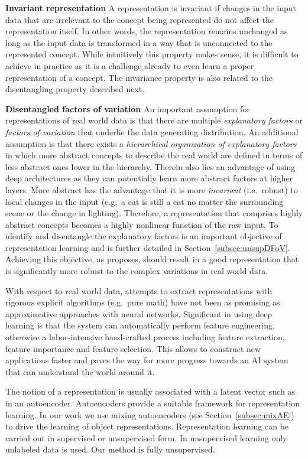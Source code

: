 \documentclass[a4paper,12pt]{report}
\begin{document}
\textbf{Invariant representation}
A representation is invariant if changes in the input data that are irrelevant to the concept being represented do not affect the representation itself. In other words, the representation remains unchanged as long as the input data is transformed in a way that is unconnected to the represented concept. While intuitively this property makes sense, it is difficult to achieve in practice as it is a challenge already to even learn a proper representation of a concept. The invariance property is also related to the disentangling property described next.

\textbf{Disentangled factors of variation} An important assumption for representations of real world data is that there are multiple \textit{explanatory factors} or \textit{factors of variation} that underlie the data generating distribution. An additional assumption is that there exists a \textit{hierarchical organization of explanatory factors} in which more abstract concepts to describe the real world are defined in terms of less abstract ones lower in the hierarchy. Therein also lies an advantage of using deep architectures as they can potentially learn more abstract factors at higher layers. More abstract has the advantage that it is more \textit{invariant} (i.e.\ robust) to local changes in the input (e.g.\ a cat is still a cat no matter the surrounding scene or the change in lighting). Therefore, a representation that comprises highly abstract concepts becomes a highly nonlinear function of the raw input. To identify and disentangle the explanatory factors is an important objective of representation learning and is further detailed in Section~\ref{subsec:unsupDFoV}. Achieving this objective, as \cite{ReprLearning} proposes, should result in a good representation that is significantly more robust to the complex variations in real world data. 

With respect to real world data, attempts to extract representations with rigorous explicit algorithms (e.g.\ pure math) have not been as promising as approximative approaches with neural networks. Significant in using deep learning is that the system can automatically perform feature engineering, otherwise a labor-intensive hand-crafted process including feature extraction, feature importance and feature selection. This allows to construct new applications faster and paves the way for more progress towards an AI system that can understand the world around it.

The notion of a representation is usually associated with a latent vector such as in an autoencoder. Autoencoders provide a suitable framework for representation learning. In our work we use mixing autoencoders (see Section~\ref{subsec:mixAE}) to drive the learning of object representations. Representation learning can be carried out in supervised or unsupervised form. In unsupervised learning only unlabeled data is used. Our method is fully unsupervised.
\end{document}
